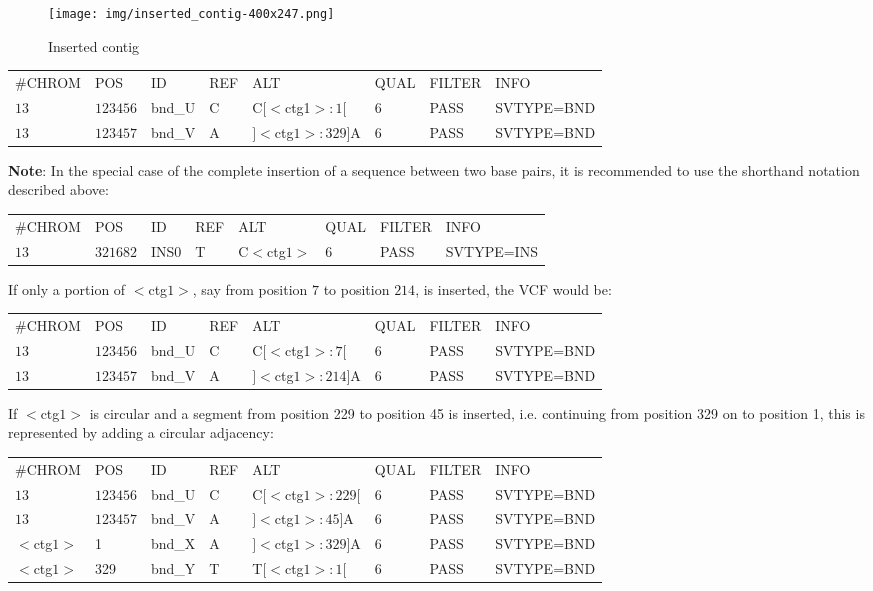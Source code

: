 \documentclass[8pt]{article}
\begin{document}
\begin{figure}[h]
\centering
\texttt{[image: img/inserted\_contig-400x247.png]}
\caption{Inserted contig}
\end{figure}

\vspace{0.3cm}
\small
\begin{tabular}{ l l l l l l l l }
\#CHROM & POS & ID & REF & ALT & QUAL & FILTER & INFO \\
$13$ & $123456$ & bnd\_U & C & C$[<$ctg1$>:1[$ & $6$ & PASS & SVTYPE=BND \\
$13$ & $123457$ & bnd\_V & A & $]<$ctg$1>:329]$A & $6$ & PASS & SVTYPE=BND \\
\end{tabular}
\normalsize
\vspace{0.3cm}

\textbf{Note}: In the special case of the complete insertion of a sequence between two base pairs, it is recommended to use the shorthand notation described above:

\vspace{0.3cm}
\begin{tabular}{ l l l l l l l l }
\#CHROM & POS & ID & REF & ALT & QUAL & FILTER & INFO \\
$13$ & $321682$ & INS0 & T & C$<$ctg$1>$ & $6$ & PASS & SVTYPE=INS \\
\end{tabular}
\vspace{0.3cm}

If only a portion of $<$ctg$1>$, say from position $7$ to position $214$, is inserted, the VCF would be:

\vspace{0.3cm}
\small
\begin{tabular}{ l l l l l l l l }
\#CHROM & POS & ID & REF & ALT & QUAL & FILTER & INFO \\
$13$ & $123456$ & bnd\_U & C & C$[<$ctg1$>:7[$ & $6$ & PASS & SVTYPE=BND \\
$13$ & $123457$ & bnd\_V & A & $]<$ctg$1>:214]$A & $6$ & PASS & SVTYPE=BND \\
\end{tabular}
\normalsize
\vspace{0.3cm}

If $<$ctg$1>$ is circular and a segment from position 229 to position 45 is inserted, i.e. continuing from position 329 on to position 1, this is represented by adding a circular adjacency:

\vspace{0.3cm}
\small
\begin{tabular}{ l l l l l l l l }
\#CHROM & POS & ID & REF & ALT & QUAL & FILTER & INFO \\
$13$ & $123456$ & bnd\_U & C & C$[<$ctg$1>:229[$ & 6 & PASS & SVTYPE=BND \\
$13$ & $123457$ & bnd\_V & A & $]<$ctg$1>:45]$A & 6 & PASS & SVTYPE=BND \\
$<$ctg$1>$ & 1 & bnd\_X & A & $]<$ctg$1>:329]$A & 6 & PASS & SVTYPE=BND \\
$<$ctg$1>$ & 329 & bnd\_Y & T & T$[<$ctg$1>:1[$ & 6 & PASS & SVTYPE=BND \\
\end{tabular}
\normalsize
\end{document}
